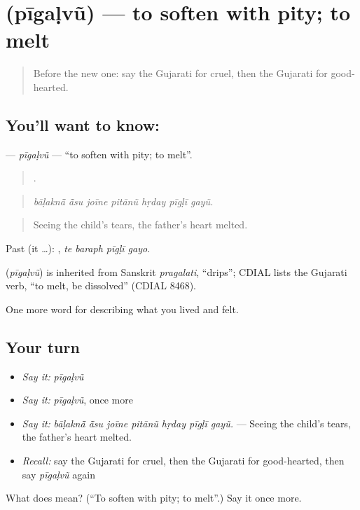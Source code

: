 \section[\texorpdfstring{\gu{પીગળવું} (pīgaḷvũ)}{પીગળવું (pīgaḷvũ)}]{ (pīgaḷvũ) — to soften with pity; to melt}

\label{lesson:GU-C459-pigalvu}



\begin{quote}
Before the new one: say the Gujarati for cruel, then the Gujarati for good-hearted.
\end{quote}

\subsection*{You'll want to know: }
\textbf{} — \emph{pīgaḷvũ} — \textquotedblleft{}to soften with pity; to melt\textquotedblright{}.

\begin{quote}
      .
\end{quote}

\begin{quote}
\emph{bāḷaknā̃ ā̃su joīne pitānũ hṛday pīgḷī gayũ.}
\end{quote}

\begin{quote}
Seeing the child's tears, the father's heart melted.
\end{quote}

Past (it …):    , \emph{te baraph pīgḷī gayo}.

\begin{cousinweb}
\textbf{} (\emph{pīgaḷvũ}) is inherited from Sanskrit \emph{pragalati}, \textquotedblleft{}drips\textquotedblright{}; CDIAL lists the Gujarati verb, \textquotedblleft{}to melt, be dissolved\textquotedblright{} (CDIAL 8468).
\end{cousinweb}

\begin{grammarlens}[title={What you've built}]
One more word for describing what you lived and felt.
\end{grammarlens}

\subsection*{Your turn}
\begin{itemize}
\raggedright
  \item \emph{Say it:} \emph{pīgaḷvũ}
  \item \emph{Say it:} \emph{pīgaḷvũ}, once more
  \item \emph{Say it:} \emph{bāḷaknā̃ ā̃su joīne pitānũ hṛday pīgḷī gayũ.} — Seeing the child's tears, the father's heart melted.
  \item \emph{Recall:} say the Gujarati for cruel, then the Gujarati for good-hearted, then say \emph{pīgaḷvũ} again
\end{itemize}

\begin{tcolorbox}[breakable,colback=teal!4,colframe=teal!35!black,title={Before you move on}]
What does  mean? (\textquotedblleft{}To soften with pity; to melt\textquotedblright{}.) Say it once more.
\end{tcolorbox}
